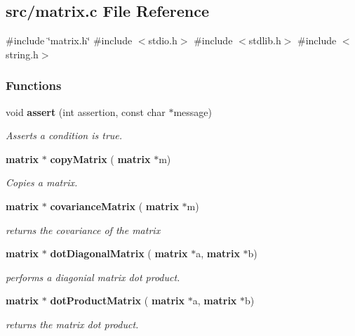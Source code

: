 \subsection{src/matrix.c File Reference}
\label{a00125}
{\ttfamily \#include \char`\"{}matrix.\+h\char`\"{}}\newline
{\ttfamily \#include $<$stdio.\+h$>$}\newline
{\ttfamily \#include $<$stdlib.\+h$>$}\newline
{\ttfamily \#include $<$string.\+h$>$}\newline
\subsubsection*{Functions}
\begin{DoxyCompactItemize}
\item 
void \textbf{ assert} (int assertion, const char $\ast$message)
\begin{DoxyCompactList}\small\item\em Asserts a condition is true. \end{DoxyCompactList}\item 
\textbf{ matrix} $\ast$ \textbf{ copy\+Matrix} (\textbf{ matrix} $\ast$m)
\begin{DoxyCompactList}\small\item\em Copies a matrix. \end{DoxyCompactList}\item 
\textbf{ matrix} $\ast$ \textbf{ covariance\+Matrix} (\textbf{ matrix} $\ast$m)
\begin{DoxyCompactList}\small\item\em returns the covariance of the matrix \end{DoxyCompactList}\item 
\textbf{ matrix} $\ast$ \textbf{ dot\+Diagonal\+Matrix} (\textbf{ matrix} $\ast$a, \textbf{ matrix} $\ast$b)
\begin{DoxyCompactList}\small\item\em performs a diagonial matrix dot product. \end{DoxyCompactList}\item 
\textbf{ matrix} $\ast$ \textbf{ dot\+Product\+Matrix} (\textbf{ matrix} $\ast$a, \textbf{ matrix} $\ast$b)
\begin{DoxyCompactList}\small\item\em returns the matrix dot product. \end{DoxyCompactList}\item 

\end{DoxyCompactItemize}
